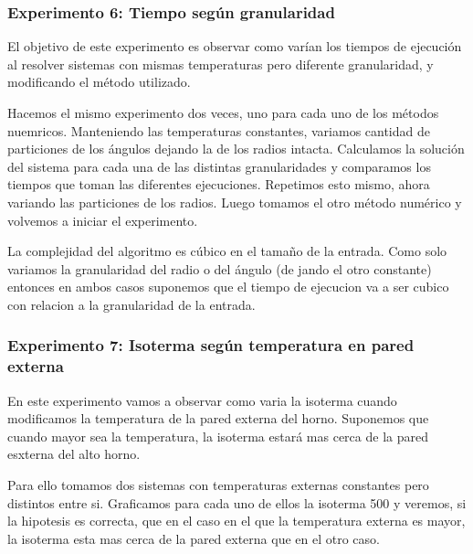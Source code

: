   	\subsubsection*{Experimento 6: Tiempo según granularidad}
  	El objetivo de este experimento es observar como varían los tiempos de ejecución al resolver sistemas con mismas temperaturas pero diferente granularidad, y modificando el método utilizado.
  	
    Hacemos el mismo experimento dos veces, uno para cada uno de los métodos nuemricos. Manteniendo las temperaturas constantes, variamos cantidad de particiones de los ángulos dejando la de los radios intacta. Calculamos la solución del sistema para cada una de las distintas granularidades y comparamos los tiempos que toman las diferentes ejecuciones. Repetimos esto mismo, ahora variando las particiones de los radios. Luego tomamos el otro método numérico y volvemos a iniciar el experimento. 

  	La complejidad del algoritmo es cúbico en el tamaño de la entrada. Como solo variamos la granularidad del radio o del ángulo (de jando el otro constante) entonces en ambos casos suponemos que el tiempo de ejecucion va a ser cubico con relacion a la granularidad de la entrada.


    \subsubsection*{Experimento 7: Isoterma según temperatura en pared externa}
    En este experimento vamos a observar como varia la isoterma cuando modificamos la temperatura de la pared externa del horno.
    Suponemos que cuando mayor sea la temperatura, la isoterma estará mas cerca de la pared esxterna del alto horno. 


    Para ello tomamos dos sistemas con temperaturas externas constantes pero distintos entre si. Graficamos para cada uno de ellos la isoterma 500 y veremos, si la hipotesis es correcta, que en el caso en el que la temperatura externa es mayor, la isoterma esta mas cerca de la pared externa que en el otro caso. 
